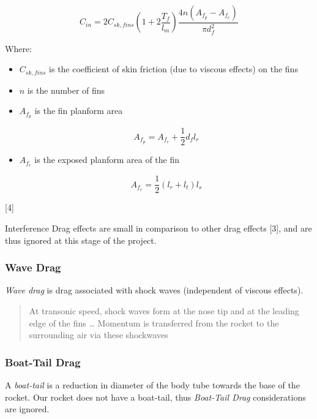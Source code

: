 \documentclass[]{article}
\providecommand{\tightlist}{%
  \setlength{\itemsep}{0pt}\setlength{\parskip}{0pt}}
\begin{document}
\begin{equation}
\label{eq_interference_drag_coefficient}
C_{in} = 2 C_{sk,fins} \left( 1 + 2 \dfrac{T_f}{l_m} \right) \dfrac{4n(A_{f_p}-A_{f_e})} {\pi d^2_f}
\end{equation}

Where:

\begin{itemize}
\tightlist
\item
  \(C_{sk,fins}\) is the coefficient of skin friction (due to viscous
  effects) on the fins
\item
  \(n\) is the number of fins
\item
  \(A_{f_p}\) is the fin planform area

  \begin{equation}
  \label{eq_fin_planform_area}
  A_{f_p} = A_{f_e} + \dfrac{1}{2} d_f l_r
  \end{equation}
\item
  \(A_{f_e}\) is the exposed planform area of the fin

  \begin{equation}
  \label{eq_exposed_fin_planform_area}
  A_{f_e} = \dfrac{1}{2} (l_r + l_t) l_s 
  \end{equation}
\end{itemize}

{[}4{]}

Interference Drag effects are small in comparison to other drag effects
{[}3{]}, and are thus ignored at this stage of the project.

\subsubsection{Wave Drag}\label{wave-drag}

\emph{Wave drag} is drag associated with shock waves (independent of
viscous effects).

\begin{quote}
At transonic speed, shock waves form at the nose tip and at the leading
edge of the fins \ldots{} Momentum is transferred from the rocket to the
surrounding air via these shockwaves
\end{quote}

\subsubsection{Boat-Tail Drag}\label{boat-tail-drag}

A \emph{boat-tail} is a reduction in diameter of the body tube towards
the base of the rocket. Our rocket does not have a boat-tail, thus
\emph{Boat-Tail Drag} considerations are ignored.
\end{document}
